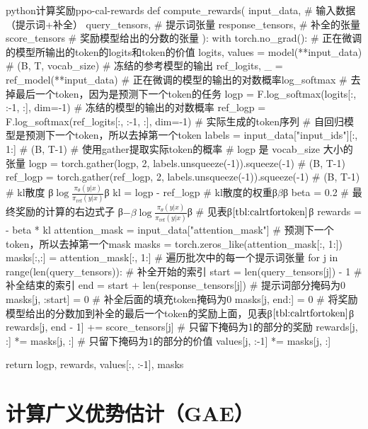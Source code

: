 \documentclass[lang=cn,newtx,10pt,scheme=chinese]{elegantbook}
\begin{document}
\begin{codebox}{python}{计算奖励}{ppo-cal-rewards}
def compute_rewards(
    input_data, # 输入数据（提示词+补全）
    query_tensors, # 提示词张量
    response_tensors, # 补全的张量
    score_tensors # 奖励模型给出的分数的张量
):
    with torch.no_grad():
        # 正在微调的模型所输出的token的logits和token的价值
        logits, values = model(**input_data) # (B, T, vocab_size)
        # 冻结的参考模型的输出
        ref_logits, _ = ref_model(**input_data)
        # 正在微调的模型的输出的对数概率log_softmax
        # 去掉最后一个token，因为是预测下一个token的任务
        logp = F.log_softmax(logits[:, :-1, :], dim=-1)
        # 冻结的模型的输出的对数概率
        ref_logp = F.log_softmax(ref_logits[:, :-1, :], dim=-1)
        # 实际生成的token序列
        # 自回归模型是预测下一个token，所以去掉第一个token
        labels = input_data["input_ids"][:, 1:] # (B, T-1)
        # 使用gather提取实际token的概率
        # logp 是 vocab_size 大小的张量
        logp = torch.gather(logp, 2, labels.unsqueeze(-1)).squeeze(-1) # (B, T-1)
        ref_logp = torch.gather(ref_logp, 2, labels.unsqueeze(-1)).squeeze(-1) # (B, T-1)
        # kl散度 β$\log\frac{\pi_\theta(y|x)}{\pi_\text{ref}(y|x)}$β
        kl = logp - ref_logp
        # kl散度的权重β$\beta$β
        beta = 0.2
        # 最终奖励的计算的右边式子 β$-\beta\log\frac{\pi_\theta(y|x)}{\pi_\text{ref}(y|x)}$β
        # 见表β$\ref{tbl:calrtfortoken}$β
        rewards = - beta * kl
        attention_mask = input_data["attention_mask"]
        # 预测下一个token，所以去掉第一个mask
        masks = torch.zeros_like(attention_mask[:, 1:])
        masks[:,:] = attention_mask[:, 1:]
        # 遍历批次中的每一个提示词张量
        for j in range(len(query_tensors)):
            # 补全开始的索引
            start = len(query_tensors[j]) - 1
            # 补全结束的索引
            end = start + len(response_tensors[j])
            # 提示词部分掩码为0
            masks[j, :start] = 0
            # 补全后面的填充token掩码为0
            masks[j, end:] = 0
            # 将奖励模型给出的分数加到补全的最后一个token的奖励上面，见表β$\ref{tbl:calrtfortoken}$β
            rewards[j, end - 1] += score_tensors[j]
            # 只留下掩码为1的部分的奖励
            rewards[j, :] *= masks[j, :]
            # 只留下掩码为1的部分的价值
            values[j, :-1] *= masks[j, :]

    return logp, rewards, values[:, :-1], masks
\end{codebox}

\section{计算广义优势估计（GAE）}
\end{document}
